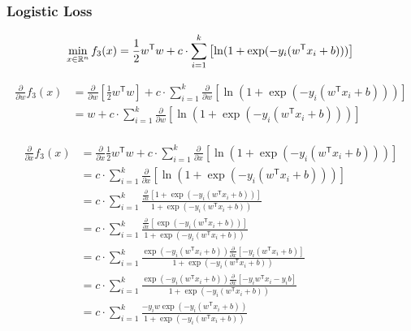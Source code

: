 \documentclass[12pt,landscape]{article}
\newcommand{\tr}{^\mathsf{T}}
\begin{document}
\subsubsection*{Logistic Loss}
\newcommand{\zLog}{1+\exp(-y_i (w\tr x_i + b))}

\begin{equation}
\min\limits_{x \in \mathbb{R}^n} f_3(x) = \frac{1}{2} w\tr w +c \cdot \sum\limits_{i=1}^k \left[ \ln(\zLog)\right]\\
\end{equation}

\begin{align*}
\frac{\partial}{\partial w} f_3(x) &= \frac{\partial}{\partial w} \left[ \frac{1}{2} w\tr w \right] +c \cdot \sum\limits_{i=1}^k \frac{\partial}{\partial w} \left[ \ln(\zLog)\right]\\
&= w +c \cdot \sum\limits_{i=1}^k \frac{\partial}{\partial w} \left[ \ln(\zLog)\right]\\
\end{align*}

\begin{align*}
\frac{\partial}{\partial x} f_3(x) &= \frac{\partial}{\partial x} \frac{1}{2} w\tr w +c \cdot \sum\limits_{i=1}^k \frac{\partial}{\partial x} \left[ \ln(\zLog)\right]\\
&= c \cdot \sum\limits_{i=1}^k \frac{\partial}{\partial x} \left[ \ln(1+\exp(-y_i\left(w\tr x_i + b \right) ))\right] \\
&= c \cdot \sum\limits_{i=1}^k \frac{\frac{\partial}{\partial x} \left[ 1+\exp(-y_i(w\tr x_i + b)) \right]} {\zLog} \\
&= c \cdot \sum\limits_{i=1}^k \frac{\frac{\partial}{\partial x} \left[ \exp(-y_i(w\tr x_i + b))\right]}{\zLog} \\
&= c \cdot \sum\limits_{i=1}^k \frac{ \exp(-y_i(w\tr x_i + b)) \frac{\partial}{\partial x} \left[ -y_i (w\tr x_i + b)  \right]}{\zLog}\\
&= c \cdot \sum\limits_{i=1}^k \frac{ \exp(-y_i(w\tr x_i + b)) \frac{\partial}{\partial x} \left[ -y_i w\tr x_i -y_i b \right]}{\zLog}\\
&= c \cdot \sum\limits_{i=1}^k \frac{ -y_i w\exp(-y_i(w\tr x_i + b)) }{\zLog}\\
\end{align*}

\newcommand{\dLogz}{-y_i w \exp(-y_i(w\tr x_i + b))}
\newcommand{\dLogn}{\zLog}
\end{document}
